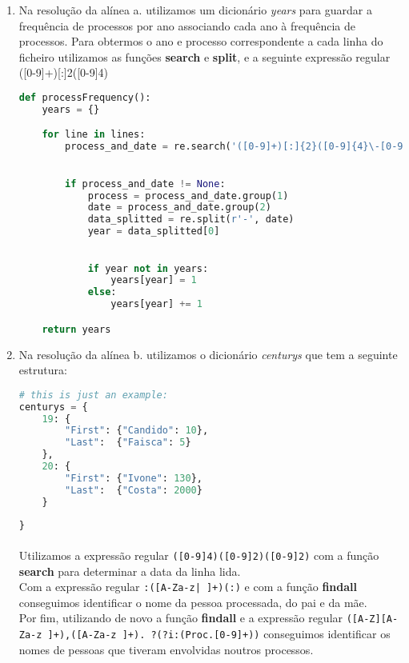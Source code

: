 \documentclass[11pt,a4paper]{report}
\begin{document}
    \begin{enumerate}[label=\alph*.]
        \item Na resolução da alínea a. utilizamos um dicionário \textit{years} para guardar a frequência de processos por ano associando cada ano à frequência de processos. Para obtermos o ano e processo correspondente a cada linha do ficheiro utilizamos as funções \textbf{search} e \textbf{split}, e a seguinte expressão regular ([0-9]+)[:]{2}([0-9]{4}) \\
        \begin{lstlisting}[language=Python]
def processFrequency():
    years = {}

    for line in lines:
        process_and_date = re.search('([0-9]+)[:]{2}([0-9]{4}\-[0-9]{2}\-[0-9]{2})', line)
    

        if process_and_date != None:
            process = process_and_date.group(1)
            date = process_and_date.group(2)
            data_splitted = re.split(r'-', date)
            year = data_splitted[0]

        
            if year not in years:
                years[year] = 1
            else:
                years[year] += 1

    return years
        \end{lstlisting}

        \item Na resolução da alínea b. utilizamos o dicionário \textit{centurys} que tem a seguinte estrutura:
        \begin{lstlisting}[language=Python]
# this is just an example:
centurys = {
    19: {
        "First": {"Candido": 10},
        "Last":  {"Faisca": 5}
    },
    20: {
        "First": {"Ivone": 130},
        "Last":  {"Costa": 2000}
    }
    
}
        \end{lstlisting}

        \paragraph{}
        Utilizamos a expressão regular \texttt{([0-9]{4})\-([0-9]{2})\-([0-9]{2})} com a função \textbf{search} para determinar a data da linha lida.\\ Com a expressão regular \texttt{:([A-Za-z| ]+)(:)} e com a função \textbf{findall} conseguimos identificar o nome da pessoa processada, do pai e da mãe.\\Por fim, utilizando de novo a função \textbf{findall} e a expressão regular \texttt{([A-Z][A-Za-z ]+),([A-Za-z ]+). ?(?i:(Proc.[0-9]+))} conseguimos  identificar os nomes de pessoas que tiveram envolvidas noutros processos.


\end{enumerate}
\end{document}
